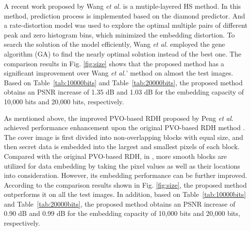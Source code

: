 \documentclass[review,3p,10pt,sort&compress]{elsarticle}
\begin{document}
A recent work \cite{Wang2017Rate} proposed by Wang \emph{et al.} is a mutiple-layered HS method. In this method, prediction process is implemented based on the diamond predictor. And a rate-distortion model was used to explore the optimal multiple pairs of different peak and zero histogram bins, which minimized the embedding distortion. To search the solution of the model efficiently, Wang \emph{et al.} employed the gene algorithm (GA) to find the nearly optimal solution instead of the best one. The comparison results in Fig. \ref{fig:size} shows that the proposed method has a significant improvement over Wang \emph{et al.}' method on almost the test images. Based on Table~\ref{tab:10000bits} and Table~\ref{tab:20000bits}, the proposed method obtains an PSNR increase of 1.35 dB and 1.03 dB for the embedding capacity of 10,000 bits and 20,000 bits, respectively.


As mentioned above, the improved PVO-based RDH proposed by Peng \emph{et al.} \cite{Peng2014IPVO} achieved performance enhancement upon the original PVO-based RDH method \cite{Li2013PVO}. The cover image is first divided into non-overlapping blocks with equal size, and then secret data is embedded into the largest and smallest pixels of each block. Compared with the original PVO-based RDH, in \cite{Peng2014IPVO}, more smooth blocks are utilized for data embedding by taking the pixel values as well as their locations into consideration. However, its embedding performance can be further improved. According to the comparison results shown in Fig. \ref{fig:size}, the proposed method outperforms it on all the test images. In addition, based on Table~\ref{tab:10000bits} and Table~\ref{tab:20000bits}, the proposed method obtains an PSNR increase of 0.90 dB and 0.99 dB for the embedding capacity of 10,000 bits and 20,000 bits, respectively.

\end{document}
